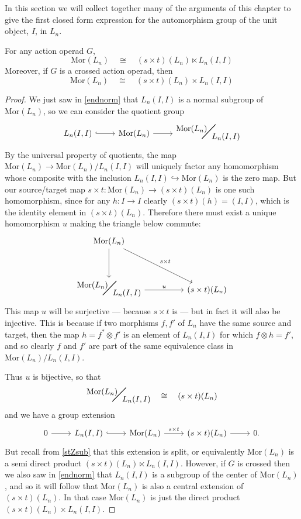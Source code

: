 \documentclass{amsbook} %
\newcommand{\bigquotient}[2]{ \raisebox{0.75\height}{$#1$} \mkern-12mu\scalebox{2}{$\diagup$}\mkern-10mu \raisebox{-0.5\height}{$#2$} }
\numberwithin{section}{chapter}
\begin{document}
In this section we will collect together many of the arguments of this chapter to give the first closed form expression for the automorphism group of the unit object, $I$, in $L_n$.
\begin{prop} \label{morprod} For any action operad $G$,
\[ \mathrm{Mor}(L_n) \quad \cong \quad (s \times t)(L_n) \ltimes L_n(I,I) \]
Moreover, if $G$ is a crossed action operad, then
\[ \mathrm{Mor}(L_n) \quad \cong \quad (s \times t)(L_n) \times L_n(I,I) \]
\end{prop}
\begin{proof}
We just saw in \cref{endnorm} that $L_n(I,I)$ is a normal subgroup of $\mathrm{Mor}(L_n)$, so we can consider the quotient group
\[ \begin{tikzcd}
L_n(I,I) \ar[r, hookrightarrow] & \mathrm{Mor}(L_n) \ar[r] & \bigquotient{\mathrm{Mor}(L_n)}{L_n(I,I)}
\end{tikzcd} \]
By the universal property of quotients, the map $\mathrm{Mor}(L_n) \to \mathrm{Mor}(L_n) / L_n(I,I)$ will uniquely factor any homomorphism whose composite with the inclusion $L_n(I,I) \hookrightarrow \mathrm{Mor}(L_n)$ is the zero map. But our source/target map $s \times t : \mathrm{Mor}(L_n) \to (s \times t)(L_n)$ is one such homomorphism, since for any $h: I \to I$ clearly $(s \times t)(h) = (I, I)$, which is the identity element in $(s \times t)(L_n)$. Therefore there must exist a unique homomorphism $u$ making the triangle below commute:
\[ \begin{tikzcd}
\mathrm{Mor}(L_n) \ar[dd] \ar[ddrr, "s \times t"] & & \\
& & \\
\bigquotient{\mathrm{Mor}(L_n)}{L_n(I,I)} \ar[rr, "u"] & & (s \times t)(L_n)
\end{tikzcd} \]
This map $u$ will be surjective --- because $s \times t$ is --- but in fact it will also be injective. This is because if two morphisms $f, f'$ of $L_n$ have the same source and target, then the map $h = f^* \otimes f'$ is an element of $L_n(I,I)$ for which $f \otimes h = f'$, and so clearly $f$ and $f'$ are part of the same equivalence class in $\mathrm{Mor}(L_n)/L_n(I,I)$. 

Thus $u$ is bijective, so that
\[ \bigquotient{\mathrm{Mor}(L_n)}{L_n(I,I)} \quad \cong \quad (s \times t)(L_n) \]
and we have a group extension
\[ \begin{tikzcd}
0 \ar[r] & L_n(I,I) \ar[r, hookrightarrow] & \mathrm{Mor}(L_n) \ar[r, "s \times t"] & (s \times t)(L_n) \ar[r] & 0.
\end{tikzcd} \]
But recall from \cref{stZsub} that this extension is split, or equivalently $\mathrm{Mor}(L_n)$ is a semi direct product $(s \times t)(L_n) \ltimes L_n(I,I)$. However, if $G$ is crossed then we also saw in \cref{endnorm} that $L_n(I,I)$ is a subgroup of the center of $\mathrm{Mor}(L_n)$, and so it will follow that $\mathrm{Mor}(L_n)$ is also a central extension of $(s \times t)(L_n)$. In that case $\mathrm{Mor}(L_n)$ is just the direct product $(s \times t)(L_n) \times L_n(I,I)$.
\end{proof}
\end{document}
